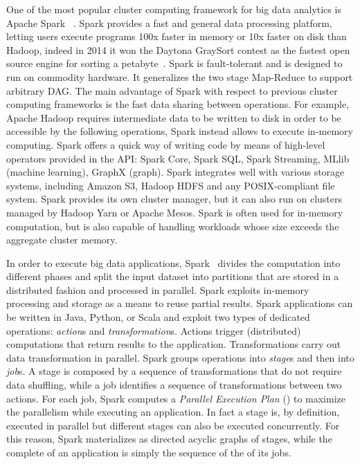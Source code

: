 One of the most popular cluster computing framework for big data analytics is Apache Spark  ~\cite{articleApacheSpark:2015}. Spark provides a fast and general data processing platform, letting users execute programs 100x faster in memory or 10x faster on disk than Hadoop, indeed in 2014 it won the Daytona GraySort contest as the fastest open source engine for sorting a petabyte~\cite{articleApacheSpark:2016}. Spark is fault-tolerant and is designed to run on commodity hardware. It generalizes the two stage Map-Reduce to support arbitrary DAG. The main advantage of Spark with respect to previous cluster computing frameworks is the fast data sharing between operations. For example, Apache Hadoop requires intermediate data to be written to disk in order to be accessible by the following operations, Spark instead allows to execute in-memory computing. Spark offers a quick way of writing code by means of high-level operators provided in the API: Spark Core, Spark SQL, Spark Streaming, MLlib (machine learning), GraphX (graph). Spark integrates well with various storage systems,  including Amazon S3, Hadoop HDFS and any POSIX-compliant file system. Spark provides its own cluster manager, but it can also run on clusters managed by Hadoop Yarn or Apache Mesos. Spark is often used for in-memory computation, but is also capable of handling workloads whose size exceeds the aggregate cluster memory. 

In order to execute big data applications, Spark~\cite{Zaharia2010} divides the computation into different phases and split the input dataset into partitions that are stored in a distributed fashion and processed in parallel. Spark exploits in-memory processing and storage as a means to reuse partial results. Spark applications can be written in Java, Python, or Scala and exploit two types of dedicated operations: \textit{action}s and  \textit{transformation}s. Actions trigger (distributed) computations that return results to the application. Transformations carry out data transformation in parallel. Spark groups operations into \textit{stage}s and then into \textit{job}s. A stage is composed by a sequence of transformations that do not require data shuffling, while a job identifies a sequence of transformations between two actions. For each job, Spark computes a \textit{Parallel Execution Plan} (\plan) to maximize the parallelism while executing an application. In fact a stage is, by definition, executed in parallel but different stages can also be executed concurrently. For this reason, Spark materializes \plans as directed acyclic graphs of stages, while the complete \plan of an application is simply the sequence of the \plans of its jobs. 

